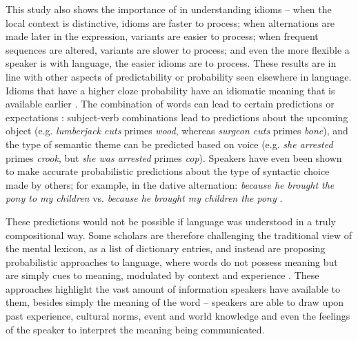 \documentclass[output=paper,modfonts,nonflat]{langsci/langscibook}
\begin{document}
This study also shows the importance of  in understanding idioms -- when the local context is distinctive, idioms are faster to process; when alternations are made later in the expression, variants are easier to process; when frequent sequences are altered, variants are slower to process; and even the more flexible a speaker is with language, the easier idioms are to process. These results are in line with other aspects of predictability or probability seen elsewhere in language. Idioms that have a higher cloze probability have an idiomatic meaning that is available earlier \citep{CacciariTabossi1988, TitoneConnine1994b}. The combination of words can lead to certain predictions or expectations \citep{Elman2011}: subject-verb combinations lead to predictions about the upcoming object (e.g. \textit{lumberjack cuts} primes \textit{wood}, whereas \textit{surgeon cuts} primes \textit{bone}), and the type of semantic theme can be predicted based on voice (e.g. \textit{she arrested} primes \textit{crook}, but \textit{she was arrested} primes \textit{cop}). Speakers have even been shown to make accurate probabilistic predictions about the type of syntactic choice made by others; for example, in the dative alternation: \textit{because he brought the pony to my children} vs. \textit{because he brought my children the pony} \citep{Bresnan2007}.

These predictions would not be possible if language was understood in a truly compositional way. Some scholars are therefore challenging the traditional view of the mental lexicon, as a list of dictionary entries, and instead are proposing probabilistic approaches to language, where words do not possess meaning but are simply cues to meaning, modulated by context and experience \citep{Elman2004, Elman2011, RamscarBaayen2013, RamscarBaayen2013}. These approaches highlight the vast amount of information speakers have available to them, besides simply the meaning of the word -- speakers are able to draw upon past experience, cultural norms, event and world knowledge and even the feelings of the speaker to interpret the meaning being communicated. 
\end{document}
